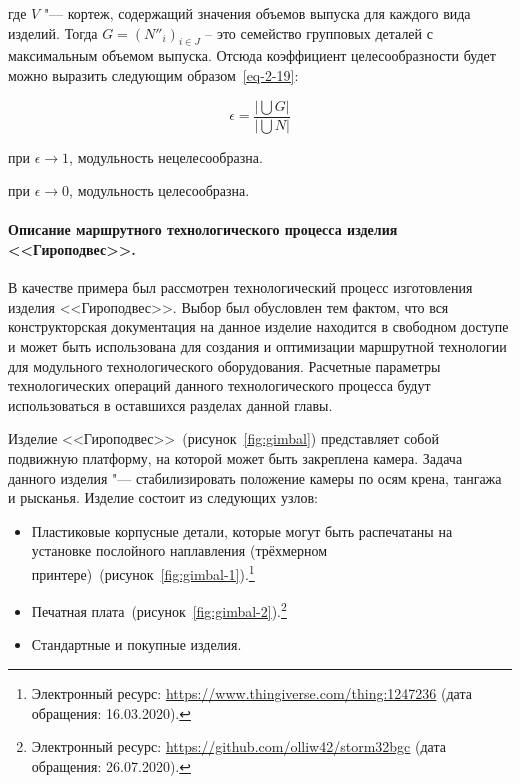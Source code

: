 %

\noindent где $V$ "--- кортеж, содержащий значения объемов выпуска для каждого вида изделий. Тогда $G=({N''}_i)_{i \in J}$ -- это семейство групповых деталей с максимальным объемом выпуска.
Отсюда коэффициент целесообразности будет можно выразить следующим образом~\cref{eq-2-19}:

\begin{equation}
\epsilon = \frac{\big|\bigcup G \big|}{\big|\bigcup N \big|}
\label{eq-2-19}
\end{equation}

\noindent при $\epsilon \rightarrow 1$, модульность нецелесообразна.

\noindent при $\epsilon \rightarrow 0$, модульность целесообразна.

\paragraph{Описание маршрутного технологического процесса изделия <<Гироподвес>>.}

В качестве примера был рассмотрен технологический процесс изготовления изделия <<Гироподвес>>. Выбор был обусловлен тем фактом, что вся конструкторская документация на данное изделие находится в свободном доступе и может быть использована для создания и оптимизации маршрутной технологии для модульного технологического оборудования. Расчетные параметры технологических операций данного технологического процесса будут использоваться в оставшихся разделах данной главы.

Изделие <<Гироподвес>>~(рисунок~\cref{fig:gimbal}) представляет собой подвижную платформу, на которой может быть закреплена камера. Задача данного изделия "--- стабилизировать положение камеры по осям крена, тангажа и рысканья. Изделие состоит из следующих узлов:

\begin{itemize}
	\item Пластиковые корпусные детали, которые могут быть распечатаны на установке послойного наплавления (трёхмерном принтере)~(рисунок~\cref{fig:gimbal-1}).\footnote{Электронный ресурс: \url{https://www.thingiverse.com/thing:1247236} (дата обращения: 16.03.2020).} 
	\item Печатная плата~(рисунок~\cref{fig:gimbal-2}).\footnote{Электронный ресурс: \url{https://github.com/olliw42/storm32bgc} (дата обращения: 26.07.2020).}
	\item Стандартные и покупные изделия.
\end{itemize}

